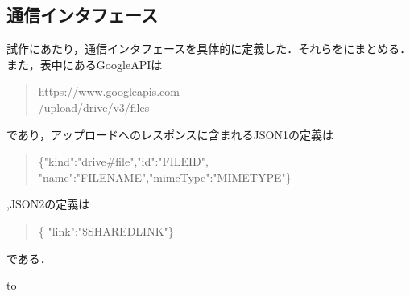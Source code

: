 \documentclass[submit,techrep,noauthor]{ipsj}
\begin{document}
\subsection{通信インタフェース}
試作にあたり，通信インタフェースを具体的に定義した．それらをにまとめる．また，表中にあるGoogleAPIは
\begin{quote}
    https://www.googleapis.com\\/upload/drive/v3/files
\end{quote}であり，アップロードへのレスポンスに含まれるJSON1の定義は\begin{quote}
    \{"kind":"drive\#file","id":"FILEID", "name":"FILENAME","mimeType":"MIMETYPE"\}
\end{quote},JSON2の定義は\begin{quote}
    \{ "link":"\$SHAREDLINK"\}
\end{quote}である．

\begin{table}[tb] 
\caption{試作物の通信インタフェース} 
\label{tab:proto-communication}
\hbox to
\end{table}


\end{document}
